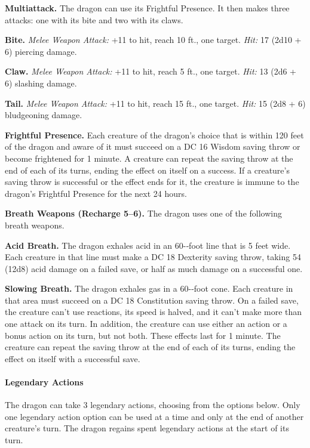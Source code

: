 \documentclass[
]{article}
\begin{document}
\textbf{Multiattack.} The dragon can use its Frightful Presence. It then
makes three attacks: one with its bite and two with its claws.

\textbf{Bite.} \emph{Melee Weapon Attack:} +11 to hit, reach 10 ft., one
target. \emph{Hit:} 17 (2d10 + 6) piercing damage.

\textbf{Claw.} \emph{Melee Weapon Attack:} +11 to hit, reach 5 ft., one
target. \emph{Hit:} 13 (2d6 + 6) slashing damage.

\textbf{Tail.} \emph{Melee Weapon Attack:} +11 to hit, reach 15 ft., one
target. \emph{Hit:} 15 (2d8 + 6) bludgeoning damage.

\textbf{Frightful Presence.} Each creature of the dragon's choice that
is within 120 feet of the dragon and aware of it must succeed on a DC 16
Wisdom saving throw or become frightened for 1 minute. A creature can
repeat the saving throw at the end of each of its turns, ending the
effect on itself on a success. If a creature's saving throw is
successful or the effect ends for it, the creature is immune to the
dragon's Frightful Presence for the next 24 hours.

\textbf{Breath Weapons (Recharge 5--6).} The dragon uses one of the
following breath weapons.

\textbf{Acid Breath.} The dragon exhales acid in an 60-­‐foot line that
is 5 feet wide. Each creature in that line must make a DC 18 Dexterity
saving throw, taking 54 (12d8) acid damage on a failed save, or half as
much damage on a successful one.

\textbf{Slowing Breath.} The dragon exhales gas in a 60-­‐foot cone.
Each creature in that area must succeed on a DC 18 Constitution saving
throw. On a failed save, the creature can't use reactions, its speed is
halved, and it can't make more than one attack on its turn. In addition,
the creature can use either an action or a bonus action on its turn, but
not both. These effects last for 1 minute. The creature can repeat the
saving throw at the end of each of its turns, ending the effect on
itself with a successful save.

\hypertarget{legendary-actions-15}{%
\paragraph{Legendary Actions}\label{legendary-actions-15}}

The dragon can take 3 legendary actions, choosing from the options
below. Only one legendary action option can be used at a time and only
at the end of another creature's turn. The dragon regains spent
legendary actions at the start of its turn.
\end{document}
